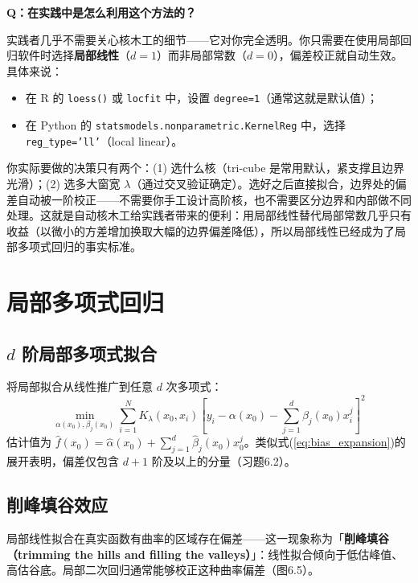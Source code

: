 \medskip
\textbf{Q：在实践中是怎么利用这个方法的？}

实践者几乎不需要关心核木工的细节——它对你完全透明。你只需要在使用局部回归软件时选择\textbf{局部线性}（$d=1$）而非局部常数（$d=0$），偏差校正就自动生效。具体来说：

\begin{itemize}
    \item 在 R 的 \texttt{loess()} 或 \texttt{locfit} 中，设置 \texttt{degree=1}（通常这就是默认值）；
    \item 在 Python 的 \texttt{statsmodels.nonparametric.KernelReg} 中，选择 \texttt{reg\_type='ll'}（local linear）。
\end{itemize}

你实际要做的决策只有两个：(1) 选什么核（tri-cube 是常用默认，紧支撑且边界光滑）；(2) 选多大窗宽 $\lambda$（通过交叉验证确定）。选好之后直接拟合，边界处的偏差自动被一阶校正——不需要你手工设计高阶核，也不需要区分边界和内部做不同处理。这就是自动核木工给实践者带来的便利：用局部线性替代局部常数几乎只有收益（以微小的方差增加换取大幅的边界偏差降低），所以局部线性已经成为了局部多项式回归的事实标准。

\section{局部多项式回归}

\subsection{$d$ 阶局部多项式拟合}

将局部拟合从线性推广到任意 $d$ 次多项式：
\begin{equation}\label{eq:local_poly}
    \min_{\alpha(x_0), \beta_j(x_0)} \sum_{i=1}^{N} K_\lambda(x_0, x_i) \left[y_i - \alpha(x_0) - \sum_{j=1}^{d} \beta_j(x_0) x_i^j\right]^2
\end{equation}
估计值为 $\hat{f}(x_0) = \hat{\alpha}(x_0) + \sum_{j=1}^{d} \hat{\beta}_j(x_0) x_0^j$。类似式(\ref{eq:bias_expansion})的展开表明，偏差仅包含 $d+1$ 阶及以上的分量（习题6.2）。

\subsection{削峰填谷效应}

局部线性拟合在真实函数有曲率的区域存在偏差——这一现象称为「\textbf{削峰填谷（trimming the hills and filling the valleys）}」：线性拟合倾向于低估峰值、高估谷底。局部二次回归通常能够校正这种曲率偏差（图6.5）。


